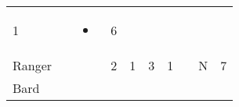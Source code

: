 \documentclass[12pt]{article}
\newcommand{\indexClass}[1]{\index{#1}}
\newcommand{\class}[1]{#1\indexClass{#1}}
\begin{document}
\begin{longtable}[]{@{}llllllllll@{}}
\begin{minipage}[t]{0.06\columnwidth}\raggedright\strut
1
\strut\end{minipage} &
\begin{minipage}[t]{0.06\columnwidth}\raggedright\strut
\strut\end{minipage} &
\begin{minipage}[t]{0.07\columnwidth}\raggedright\strut
\begin{itemize}
\item
\end{itemize}
\strut\end{minipage} &
\begin{minipage}[t]{0.08\columnwidth}\raggedright\strut
6
\strut\end{minipage}\tabularnewline
\begin{minipage}[t]{0.13\columnwidth}\raggedright\strut
\class{Ranger}
\strut\end{minipage} &
\begin{minipage}[t]{0.06\columnwidth}\raggedright\strut
\strut\end{minipage} &
\begin{minipage}[t]{0.06\columnwidth}\raggedright\strut
\strut\end{minipage} &
\begin{minipage}[t]{0.06\columnwidth}\raggedright\strut
2
\strut\end{minipage} &
\begin{minipage}[t]{0.06\columnwidth}\raggedright\strut
1
\strut\end{minipage} &
\begin{minipage}[t]{0.06\columnwidth}\raggedright\strut
3
\strut\end{minipage} &
\begin{minipage}[t]{0.06\columnwidth}\raggedright\strut
1
\strut\end{minipage} &
\begin{minipage}[t]{0.06\columnwidth}\raggedright\strut
\strut\end{minipage} &
\begin{minipage}[t]{0.07\columnwidth}\raggedright\strut
N
\strut\end{minipage} &
\begin{minipage}[t]{0.08\columnwidth}\raggedright\strut
7
\strut\end{minipage}\tabularnewline
\begin{minipage}[t]{0.13\columnwidth}\raggedright\strut
\class{Bard}
\strut\end{minipage} &

\end{longtable}
\end{document}
